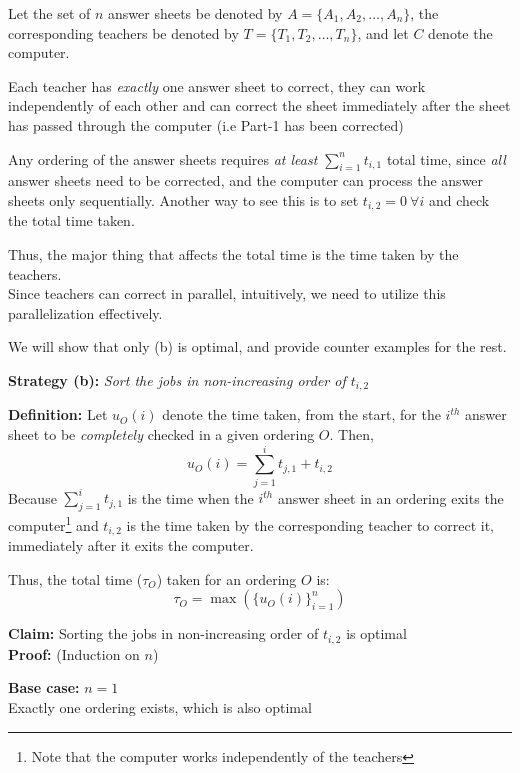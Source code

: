 \documentclass[11pt, fleqn]{article}
\begin{document}
\hrulefill
\smallskip

Let the set of $n$ answer sheets be denoted by $A = \{A_1, A_2, \ldots, A_n\}$, the corresponding teachers be denoted by $T = \{T_1, T_2, \ldots, T_n\}$, and let $C$ denote the computer.

\smallskip
Each teacher has \textit{exactly} one answer sheet to correct, they can work independently of each other and can correct the sheet immediately after the sheet has passed through the computer (i.e Part-1 has been corrected)

\smallskip
Any ordering of the answer sheets requires \textit{at least} $\sum_{i=1}^n t_{i,1}$ total time, since \textit{all} answer sheets need to be corrected, and the computer can process the answer sheets only sequentially. Another way to see this is to set $t_{i,2} = 0 \ \forall i$ and check the total time taken.

\smallskip
Thus, the major thing that affects the total time is the time taken by the teachers.\\
Since teachers can correct in parallel, intuitively, we need to utilize this parallelization effectively.

\hrulefill
\medskip

We will show that only (b) is optimal, and provide counter examples for the rest.

\medskip
\textbf{Strategy (b):} \textit{Sort the jobs in non-increasing order of $t_{i,2}$}

\medskip
\textbf{Definition:} Let $u_O(i)$ denote the time taken, from the start, for the $i^{th}$ answer sheet to be \textit{completely} checked in a given ordering $O$. Then,
$$
    u_O(i) = \sum_{j=1}^{i}t_{j,1} + t_{i,2}
$$
Because $\sum_{j=1}^{i}t_{j,1}$ is the time when the $i^{th}$ answer sheet in an ordering exits the computer\footnote{Note that the computer works independently of the teachers} and $t_{i,2}$ is the time taken by the corresponding teacher to correct it, immediately after it exits the computer.

\smallskip
Thus, the total time ($\tau_O$) taken for an ordering $O$ is: $$\tau_O = \max(\{u_O(i)\}_{i=1}^n)$$

\medskip
\textbf{Claim:} Sorting the jobs in non-increasing order of $t_{i,2}$ is optimal\\
\textbf{Proof:} (Induction on $n$)

\smallskip
\textbf{Base case:} $n=1$\\
Exactly one ordering exists, which is also optimal
\end{document}
